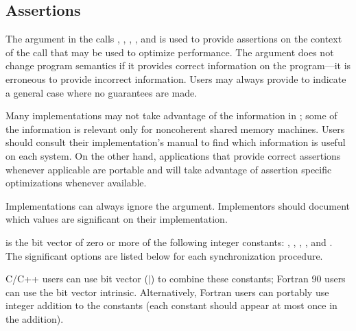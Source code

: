 \subsection{Assertions}
\label{sec:1sided-assert}

The  argument in the calls 
, ,
,
, and  is
used to provide assertions on the context of the call that may be used
to optimize performance.  The  argument does not change
program semantics if it provides correct information on the program---it
is erroneous to provide incorrect information.  Users
may always provide
 to indicate a general case where no guarantees are made.

\begin{users}
Many implementations may not take advantage of the information in
; some of the information is relevant only for
noncoherent shared memory machines.  Users
should consult their implementation's manual 
to
find which information is useful on each system. On the other hand,
applications that provide correct
assertions whenever applicable are portable and will
take advantage of assertion specific optimizations whenever available.
\end{users}

\begin{implementors}
Implementations can always ignore the  argument.
Implementors should
document which  values are significant on their
implementation.
\end{implementors}

 is the bit vector  of zero or more of the following
integer constants:
, ,
,
, and .
The significant options are listed below for each synchronization procedure.

\begin{users}
C/C++ users can use bit vector  ($\mid$) to combine these constants;
Fortran 90 users
can use the bit vector  intrinsic.
Alternatively, Fortran users can
portably use integer addition to  the constants (each constant should
appear at most once in the addition).
\end{users}

